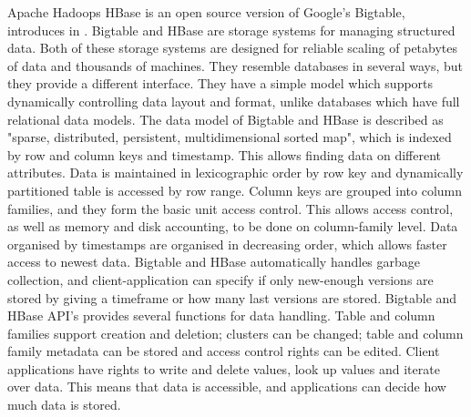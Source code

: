 \documentclass{article}
\theoremstyle{definition}
\begin{document}
Apache Hadoops HBase is an open source version of Google's Bigtable, introduces in \cite{Chang}. Bigtable and HBase are storage systems for managing structured data. Both of these storage systems are designed for reliable scaling of petabytes of data and thousands of machines. They resemble databases in several ways, but they provide a different interface. They have a simple model which supports dynamically controlling data layout and format, unlike databases which have full relational data models. The data model of Bigtable and HBase is described as "sparse, distributed, persistent, multidimensional sorted map", which is indexed by row and column keys and timestamp. This allows finding data on different attributes. Data is maintained in lexicographic order by row key and dynamically partitioned table is accessed by row range. Column keys are grouped into column families, and they form the basic unit access control. This allows access control, as well as memory and disk accounting, to be done on column-family level. Data organised by timestamps are organised in decreasing order, which allows faster access to newest data. 
Bigtable and HBase automatically handles garbage collection, and client-application can specify if only new-enough versions are stored by giving a timeframe or how many last versions are stored. 
Bigtable and HBase API's provides several functions for data handling. Table and column families support creation and deletion; clusters can be changed; table and column family metadata can be stored and access control rights can be edited. Client applications have rights to write and delete values, look up values and iterate over data. This means that data is accessible, and applications can decide how much data is stored. \\ 
\end{document}
